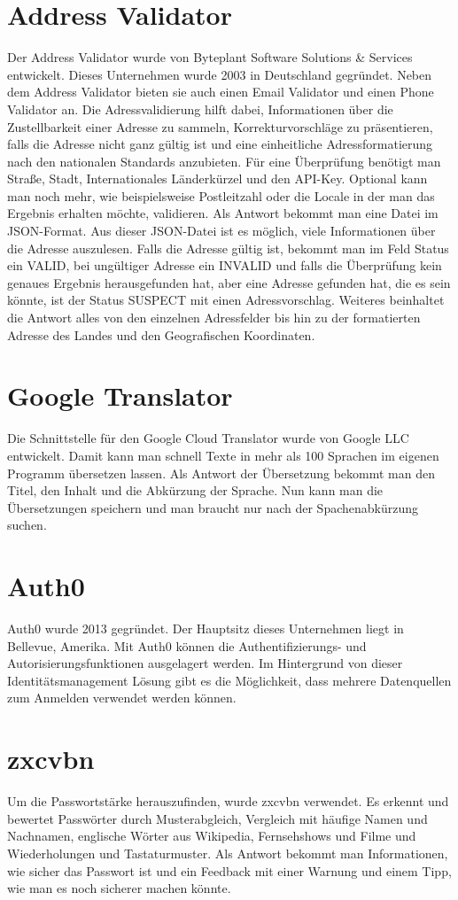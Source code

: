 \section{Address Validator}
Der Address Validator wurde von Byteplant Software Solutions \& Services entwickelt. Dieses Unternehmen wurde 2003 in Deutschland gegründet. Neben dem Address Validator bieten sie auch einen Email Validator und einen Phone Validator an. Die Adressvalidierung hilft dabei, Informationen über die Zustellbarkeit einer Adresse zu sammeln, Korrekturvorschläge zu präsentieren, falls die Adresse nicht ganz gültig ist und eine einheitliche Adressformatierung nach den nationalen Standards anzubieten. Für eine Überprüfung benötigt man Straße, Stadt, Internationales Länderkürzel und den API-Key. Optional kann man noch mehr, wie beispielsweise Postleitzahl oder die Locale in der man das Ergebnis erhalten möchte, validieren. Als Antwort bekommt man eine Datei im JSON-Format. Aus dieser JSON-Datei ist es möglich, viele Informationen über die Adresse auszulesen. Falls die Adresse gültig ist, bekommt man im Feld Status ein VALID, bei ungültiger Adresse ein INVALID und falls die Überprüfung kein genaues Ergebnis herausgefunden hat, aber eine Adresse gefunden hat, die es sein könnte, ist der Status SUSPECT mit einen Adressvorschlag. Weiteres beinhaltet die Antwort alles von den einzelnen Adressfelder bis hin zu der formatierten Adresse des Landes und den Geografischen Koordinaten. \cite{addressValidator}

\section{Google Translator}
Die Schnittstelle für den Google Cloud Translator wurde von Google LLC entwickelt. Damit kann man schnell Texte in mehr als 100 Sprachen im eigenen Programm übersetzen lassen. Als Antwort der Übersetzung bekommt man den Titel, den Inhalt und die Abkürzung der Sprache. Nun kann man die Übersetzungen speichern und man braucht nur nach der Spachenabkürzung suchen.
\cite{googleTranslator}

\section{Auth0}
Auth0 wurde 2013 gegründet. Der Hauptsitz dieses Unternehmen liegt in Bellevue, Amerika. Mit Auth0 können die Authentifizierungs- und Autorisierungsfunktionen ausgelagert werden. Im Hintergrund von dieser Identitätsmanagement Lösung gibt es die Möglichkeit, dass mehrere Datenquellen zum Anmelden verwendet werden können. \autocite{auth0}

\section{zxcvbn}
Um die Passwortstärke herauszufinden, wurde zxcvbn verwendet. Es erkennt und bewertet Passwörter durch Musterabgleich, Vergleich mit häufige Namen und Nachnamen, englische Wörter aus Wikipedia, Fernsehshows und Filme und Wiederholungen und Tastaturmuster. Als Antwort bekommt man Informationen, wie sicher das Passwort ist und ein Feedback mit einer Warnung und einem Tipp, wie man es noch sicherer machen könnte. \autocite{zxcvbn}